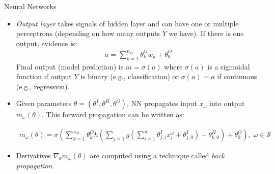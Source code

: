 \documentclass[handout,9pt]{beamer}
\begin{document}
\begin{frame}{Neural Networks}
\begin{itemize}
   \setlength{\itemsep}{5pt}
\item {\em Output layer} takes signals of hidden layer and can have one or multiple perceptrons (depending on how many outputs $Y$ we have). If there is one output,  evidence is:
\begin{align*}
a=\sum_{k=1}^{n_H}\theta_{k}^{O}w_k+\theta_{0}^O
\end{align*}
Final output (model prediction) is $m=\sigma(a)$ where $\sigma(a)$ is a sigmoidal function if output $Y$ is binary (e.g., classification) or $\sigma(a)=a$ if continuous (e.g., regression). 

\item Given parameters $\theta=(\theta^I,\theta^H,\theta^O)$, NN propagates input $x_\omega$ into output $m_{\omega}(\theta)$. This forward propagation can be written as:
\begin{block}{}
\begin{align*}
m_{\omega}(\theta)
=\sigma\left(\sum_{k=1}^{n_H}\theta_{k}^Oh\left(\sum_{j=1}g\left(\sum_{i=1}^n\theta_{j,i}^Ix_i^\omega+\theta_{j,0}^I\right)+\theta_{k,0}^H\right)+\theta_0^O\right),\; \omega \in \mathcal{S}
\end{align*}
\end{block}
\item Derivatives $\nabla_\theta m_\omega(\theta)$ are computed using a technique called {\em back propagation}.
\end{itemize}

\end{frame}

\end{document}
